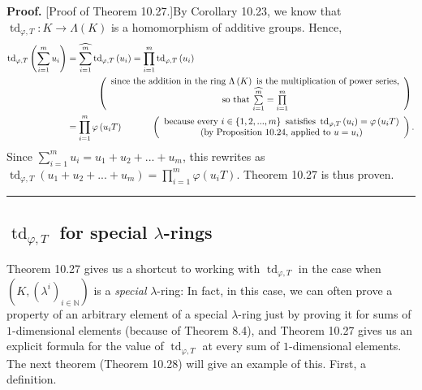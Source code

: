 \documentclass[numbers=enddot,12pt,final,onecolumn,notitlepage]{scrartcl}%
\newenvironment{proof}[1][Proof]{\noindent\textbf{#1.} }{\ \rule{0.5em}{0.5em}}
\begin{document}
\begin{proof}
[Proof of Theorem 10.27.]By Corollary 10.23, we know that $\operatorname*{td}%
_{\varphi,T}:K\rightarrow\Lambda\left(  K\right)  $ is a homomorphism of
additive groups. Hence,%
\begin{align*}
\operatorname*{td}\nolimits_{\varphi,T}\left(  \sum\limits_{i=1}^{m}%
u_{i}\right)   &  =\widehat{\sum\limits_{i=1}^{m}}\operatorname*{td}%
\nolimits_{\varphi,T}\left(  u_{i}\right)  =\prod\limits_{i=1}^{m}%
\operatorname*{td}\nolimits_{\varphi,T}\left(  u_{i}\right) \\
&  \ \ \ \ \ \ \ \ \ \ \left(
\begin{array}
[c]{c}%
\text{since the addition in the ring }\Lambda\left(  K\right)  \text{ is the
multiplication of power series,}\\
\text{so that }\widehat{\sum\limits_{i=1}^{m}}=\prod\limits_{i=1}^{m}%
\end{array}
\right) \\
&  =\prod\limits_{i=1}^{m}\varphi\left(  u_{i}T\right)
\ \ \ \ \ \ \ \ \ \ \left(
\begin{array}
[c]{c}%
\text{because every }i\in\left\{  1,2,...,m\right\}  \text{ satisfies
}\operatorname*{td}\nolimits_{\varphi,T}\left(  u_{i}\right)  =\varphi\left(
u_{i}T\right) \\
\text{(by Proposition 10.24, applied to }u=u_{i}\text{)}%
\end{array}
\right)  .
\end{align*}
Since $\sum\limits_{i=1}^{m}u_{i}=u_{1}+u_{2}+...+u_{m}$, this rewrites as
$\operatorname*{td}\nolimits_{\varphi,T}\left(  u_{1}+u_{2}+...+u_{m}\right)
=\prod\limits_{i=1}^{m}\varphi\left(  u_{i}T\right)  $. Theorem 10.27 is thus proven.
\end{proof}

\subsection{ $\operatorname*{td}_{\varphi,T}$ for special $\lambda$-rings}

Theorem 10.27 gives us a shortcut to working with $\operatorname*{td}%
\nolimits_{\varphi,T}$ in the case when $\left(  K,\left(  \lambda^{i}\right)
_{i\in\mathbb{N}}\right)  $ is a \textit{special} $\lambda$-ring: In fact, in
this case, we can often prove a property of an arbitrary element of a special
$\lambda$-ring just by proving it for sums of $1$-dimensional elements
(because of Theorem 8.4), and Theorem 10.27 gives us an explicit formula for
the value of $\operatorname*{td}\nolimits_{\varphi,T}$ at every sum of
$1$-dimensional elements. The next theorem (Theorem 10.28) will give an
example of this. First, a definition.
\end{document}
